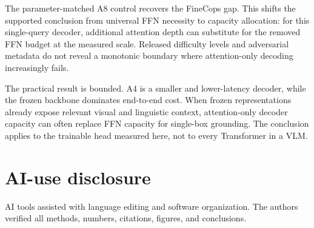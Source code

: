 \documentclass[conference]{IEEEtran}
\begin{document}
The parameter-matched A8 control recovers the FineCops gap. This shifts the supported conclusion from universal FFN necessity to capacity allocation: for this single-query decoder, additional attention depth can substitute for the removed FFN budget at the measured scale. Released difficulty levels and adversarial metadata do not reveal a monotonic boundary where attention-only decoding increasingly fails.

The practical result is bounded. A4 is a smaller and lower-latency decoder, while the frozen backbone dominates end-to-end cost. When frozen representations already expose relevant visual and linguistic context, attention-only decoder capacity can often replace FFN capacity for single-box grounding. The conclusion applies to the trainable head measured here, not to every Transformer in a VLM.

\section*{AI-use disclosure}
AI tools assisted with language editing and software organization. The authors verified all methods, numbers, citations, figures, and conclusions.



\end{document}
